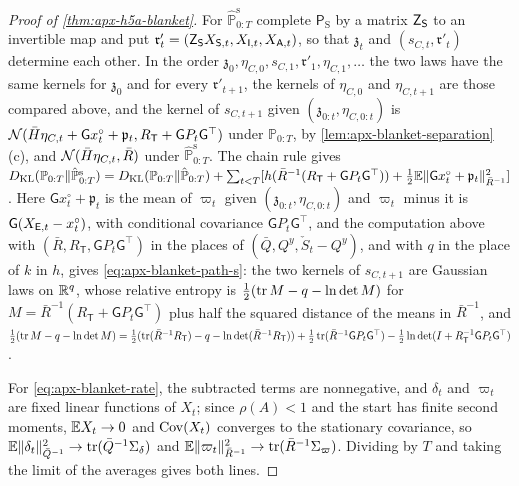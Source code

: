 \begin{proof}[Proof of \cref{thm:apx-h5a-blanket}]
For $\hat{\mathbb P}^{\mathrm s}_{0:T}$ complete $\mathsf P_{\mathrm S}$ by a matrix $\mathsf Z_{\mathsf{S}}$ to an invertible map and put $\mathfrak r'_t=(\mathsf Z_{\mathsf{S}}X_{\mathsf{S},t},X_{\mathsf{I},t},X_{\mathsf{A},t})$, so that $\mathfrak z_t$ and $(s_{C,t},\mathfrak r'_t)$ determine each other. In the order $\mathfrak z_0,\eta_{C,0},s_{C,1},\mathfrak r'_1,\eta_{C,1},\dots$ the two laws have the same kernels for $\mathfrak z_0$ and for every $\mathfrak r'_{t+1}$, the kernels of $\eta_{C,0}$ and $\eta_{C,t+1}$ are those compared above, and the kernel of $s_{C,t+1}$ given $(\mathfrak z_{0:t},\eta_{C,0:t})$ is $\mathcal{N}(\bar H\eta_{C,t}+\mathsf Gx^\circ_t+\mathfrak p_t,R_{\mathsf T}+\mathsf GP_t\mathsf G^\top)$ under $\mathbb P_{0:T}$, by \cref{lem:apx-blanket-separation}(c), and $\mathcal{N}(\bar H\eta_{C,t},\bar R)$ under $\hat{\mathbb P}^{\mathrm s}_{0:T}$. The chain rule gives $D_{\mathrm{KL}}(\mathbb P_{0:T}\Vert\hat{\mathbb P}^{\mathrm s}_{0:T})=D_{\mathrm{KL}}(\mathbb P_{0:T}\Vert\hat{\mathbb P}_{0:T})+\sum_{t<T}[h(\bar R^{-1}(R_{\mathsf T}+\mathsf GP_t\mathsf G^\top))+\frac12\mathbb{E}\Vert\mathsf Gx^\circ_t+\mathfrak p_t\Vert^2_{\bar R^{-1}}]$. Here $\mathsf Gx^\circ_t+\mathfrak p_t$ is the mean of $\varpi_t$ given $(\mathfrak z_{0:t},\eta_{C,0:t})$ and $\varpi_t$ minus it is $\mathsf G(X_{\mathsf{E},t}-x^\circ_t)$, with conditional covariance $\mathsf GP_t\mathsf G^\top$, and the computation above with $(\bar R,R_{\mathsf T},\mathsf GP_t\mathsf G^\top)$ in the places of $(\bar Q,Q^y,\check S_t-Q^y)$, and with $q$ in the place of $k$ in $h$, gives \eqref{eq:apx-blanket-path-s}: the two kernels of $s_{C,t+1}$ are Gaussian laws on $\mathbb{R}^q$, whose relative entropy is $\frac12(\operatorname{tr} M-q-\ln\det M)$ for $M=\bar R^{-1}(R_{\mathsf T}+\mathsf GP_t\mathsf G^\top)$ plus half the squared distance of the means in $\bar R^{-1}$, and $\frac12(\operatorname{tr} M-q-\ln\det M)=\frac12(\operatorname{tr}(\bar R^{-1}R_{\mathsf T})-q-\ln\det(\bar R^{-1}R_{\mathsf T}))+\frac12\operatorname{tr}(\bar R^{-1}\mathsf GP_t\mathsf G^\top)-\frac12\ln\det(I+R_{\mathsf T}^{-1}\mathsf GP_t\mathsf G^\top)$.

For \eqref{eq:apx-blanket-rate}, the subtracted terms are nonnegative, and $\delta_t$ and $\varpi_t$ are fixed linear functions of $X_t$; since $\rho(A)<1$ and the start has finite second moments, $\mathbb{E} X_t\to0$ and $\operatorname{Cov}(X_t)$ converges to the stationary covariance, so $\mathbb{E}\Vert\delta_t\Vert^2_{\bar Q^{-1}}\to\operatorname{tr}(\bar Q^{-1}\Sigma_\delta)$ and $\mathbb{E}\Vert\varpi_t\Vert^2_{\bar R^{-1}}\to\operatorname{tr}(\bar R^{-1}\Sigma_\varpi)$. Dividing by $T$ and taking the limit of the averages gives both lines.


\end{proof}
